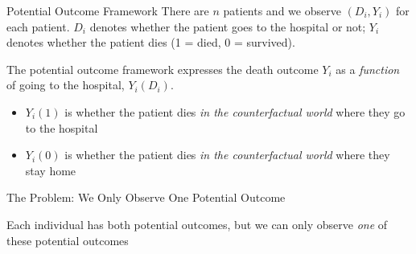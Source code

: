 \documentclass[aspectratio=169,t,11pt,table]{beamer}
\begin{document}
\begin{frame}{Potential Outcome Framework}{}
  There are $n$ patients and we observe $(D_i, Y_i)$ for each patient. $D_i$ denotes whether the patient goes to the hospital or not; $Y_i$ denotes whether the patient dies (1 = died, 0 = survived). 
  
  \pause
  \bigskip
  The potential outcome framework expresses the death outcome $Y_i$ as a \emph{function} of going to the hospital, $Y_i(D_i)$.
  \begin{itemize}
    \item $Y_i(1)$ is whether the patient dies \emph{in the counterfactual world} where they go to the hospital
    \item $Y_i(0)$ is whether the patient dies \emph{in the counterfactual world} where they stay home
  \end{itemize}
\end{frame}

\begin{frame}{The Problem: We Only Observe One Potential Outcome}

\bigskip
Each individual has both potential outcomes, but we can only observe \emph{one} of these potential outcomes
\end{frame}
\end{document}
